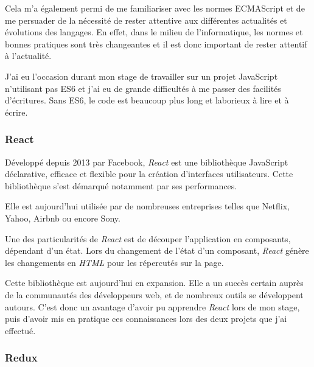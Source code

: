 \bigskip

Cela m'a également permi de me familiariser avec les normes ECMAScript
et de me persuader de la nécessité de rester attentive aux différentes
actualités et évolutions des langages. En effet, dans le milieu de
l'informatique, les normes et bonnes pratiques sont très changeantes et
il est donc important de rester attentif à l'actualité.

\bigskip

J'ai eu l'occasion durant mon stage de travailler sur un projet
JavaScript n'utilisant pas ES6 et j'ai eu de grande difficultés à me
passer des facilités d'écritures. Sans ES6, le code est beaucoup plus
long et laborieux à lire et à écrire.

\bigskip

\subsubsection{React}\label{react}

\bigskip

Développé depuis 2013 par Facebook, \emph{React} est une bibliothèque
JavaScript déclarative, efficace et flexible pour la création
d'interfaces utilisateurs. Cette bibliothèque s'est démarqué notamment
par ses performances.

\bigskip

Elle est aujourd'hui utilisée par de nombreuses entreprises telles que
Netflix, Yahoo, Airbnb ou encore Sony.

\bigskip

Une des particularités de \emph{React} est de découper l'application en
composants, dépendant d'un état. Lors du changement de l'état d'un
composant, \emph{React} génère les changements en \emph{HTML} pour les
répercutés sur la page.

\bigskip

Cette bibliothèque est aujourd'hui en expansion. Elle a un succès
certain auprès de la communautés des développeurs web, et de nombreux
outils se développent autours. C'est donc un avantage d'avoir pu
apprendre \emph{React} lors de mon stage, puis d'avoir mis en pratique
ces connaissances lors des deux projets que j'ai effectué.

\bigskip

\subsubsection{Redux}\label{redux}

\bigskip

